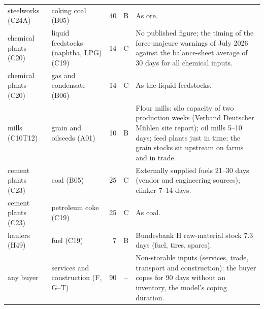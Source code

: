 \begin{longtable}{L{30mm}L{36mm}rcL{65mm}}
steelworks (C24A) & coking coal (B05) & 40 & B & As ore. \\
chemical plants (C20) & liquid feedstocks (naphtha, LPG) (C19) & 14 & C & No published figure; the timing of the force-majeure warnings of July 2026~\citep{icis2026} against the balance-sheet average of 30 days for all chemical inputs. \\
chemical plants (C20) & gas and condensate (B06) & 14 & C & As the liquid feedstocks. \\
mills (C10T12) & grain and oilseeds (A01) & 10 & B & Flour mills: silo capacity of two production weeks (Verband Deutscher M\"uhlen site report); oil mills 5--10 days; feed plants just in time; the grain stocks sit upstream on farms and in trade. \\
cement plants (C23) & coal (B05) & 25 & C & Externally supplied fuels 21--30 days (vendor and engineering sources); clinker 7--14 days. \\
cement plants (C23) & petroleum coke (C19) & 25 & C & As coal. \\
haulers (H49) & fuel (C19) & 7 & B & Bundesbank H raw-material stock 7.3 days (fuel, tires, spares). \\
any buyer & services and construction (F, G--T) & 90 & -- & Non-storable inputs (services, trade, transport and construction): the buyer copes for 90 days without an inventory, the model's coping duration. \\
\bottomrule
\end{longtable}
\endgroup

